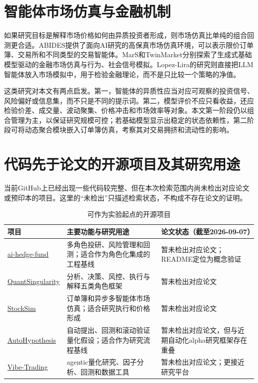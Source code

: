 \documentclass[10.5pt]{article}
\begin{document}
\section{智能体市场仿真与金融机制}

如果研究目标是解释市场价格如何由异质投资者形成，则市场仿真比单纯的组合回测更合适。ABIDES提供了面向AI研究的高保真市场仿真环境，可以表示限价订单簿、交易所和不同类型的交易智能体\citep{ByrdHybinetteBalch2019}。MarS和TwinMarket分别探索了生成式基础模型驱动的金融市场仿真与行为、社会信号模拟\citep{LiLiuLiu2024,YangZhangWu2025}。Lopez-Lira的研究则直接把LLM智能体放入市场模拟中，用于检验金融理论，而不是只比较一个策略的净值\citep{LopezLira2025}。

这类研究对本文有两点启发。第一，智能体的异质性应当对应可观察的投资信号、风险偏好或信息集，而不只是不同的提示词。第二，模型评价不应只看收益，还应检验价差、成交量、波动聚集、价格冲击和市场效率等对象。本文第一阶段仍以组合管理为主，以保证研究规模可控；若基础模型显示出稳定的状态依赖性，第二阶段可将动态聚合模块嵌入订单簿仿真，考察其对交易拥挤和流动性的影响。

\section{代码先于论文的开源项目及其研究用途}

当前GitHub上已经出现一些代码较完整、但在本次检索范围内尚未检出对应论文或预印本的项目。这里的“未检出”只描述检索状态，不构成不存在论文的证明。

\begin{table}[htbp]
\centering
\caption{可作为实验起点的开源项目}
\label{tab:opensource}
\small
\begin{tabularx}{\textwidth}{lXl}
\toprule
项目 & 主要功能与研究用途 & 论文状态（截至2026-09-07）\\
\midrule
\href{https://github.com/virattt/ai-hedge-fund}{ai-hedge-fund} & 多角色投研、风险管理和回测；适合作为角色化集成的工程基线 & 暂未检出对应论文；README定位为概念验证 \\
\href{https://github.com/QuantSingularity/LLM-Powered-Multi-Agent-Frameworks-for-Algorithmic-Trading}{QuantSingularity} & 分析、决策、风控、执行与解释五类角色框架 & 暂未检出对应论文 \\
\href{https://github.com/harrypapadakis/StockSim}{StockSim} & 订单簿和异步多智能体市场仿真；适合研究执行和价格形成 & 暂未检出对应论文 \\
\href{https://github.com/arteemg/AutoHypothesis}{AutoHypothesis} & 自动提出、回测和滚动验证量化假设；适合作为研究流程基线 & 暂未检出对应论文，但与近期自动化alpha研究框架存在重叠 \\
\href{https://github.com/HKUDS/Vibe-Trading}{Vibe-Trading} & agentic量化研究、因子分析、回测和数据工具 & 暂未检出对应论文；更接近研究平台 \\
\bottomrule
\end{tabularx}
\end{table}
\end{document}

